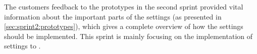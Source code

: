 The customers feedback to the prototypes in the second sprint provided vital information about the important parts of the settings (as presented in \cref{sec:sprint2:prototypes}), which gives a complete overview of how the settings should be implemented.
This sprint is mainly focusing on the implementation of settings to \launcher.
